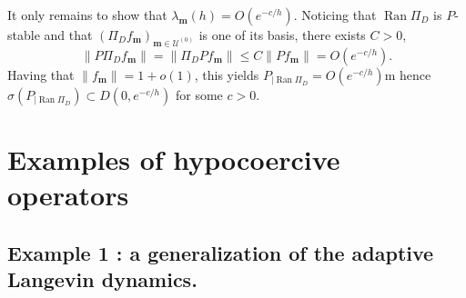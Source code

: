 \documentclass[12pt]{amsart}
\newcommand{\Ran}{\operatorname{Ran}}
\numberwithin{equation}{section}
\numberwithin{figure}{section}
\def\m{\mathbf{m}}
\newcommand{\vvert}[1]{\left\lVert#1\right\rVert}
\def\uuu{{\mathcal U}}\def\vvv{{\mathcal V}}\def\www{{\mathcal W}}\def\xxx{{\mathcal X}}
\begin{document}
It only remains to show that $\lambda_\m(h) = O(e^{-c/h})$. Noticing that $\Ran\Pi_D$ is $P$-stable and that $(\Pi_Df_\m)_{\m\in\uuu^{(0)}}$ is one of its basis, there exists $C>0$,
\begin{equation*}
\vvert{P\Pi_D f_\m} = \vvert{\Pi_D Pf_\m} \leq C\vvert{Pf_\m} = O(e^{-c/h}).
\end{equation*}
Having that $\vvert{f_\m} = 1 + o(1)$, this yields $P_{|\Ran\Pi_D} = O(e^{-c/h})$m hence $\sigma(P_{|\Ran\Pi_D})\subset D(0,e^{-c/h})$ for some $c>0$.








































\section{Examples of hypocoercive operators}\label{sec:examples}

\subsection{Example 1 : a generalization of the adaptive Langevin dynamics.}\label{ssec:exampleAdaptive}
\end{document}
